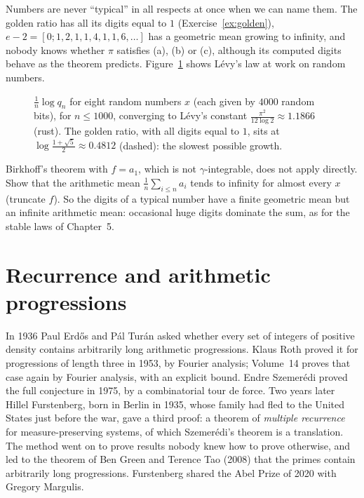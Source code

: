 Numbers are never ``typical'' in all respects at once when we can name them. The golden ratio has all its digits equal to $1$ (Exercise~\ref{ex:golden}), $e-2=[0;1,2,1,1,4,1,1,6,\dots]$ has a geometric mean growing to infinity, and
nobody knows whether $\pi$ satisfies (a), (b) or (c), although its computed digits behave as the theorem predicts. Figure~\ref{fig:levy} shows L\'evy's law at work on random numbers.

\begin{figure}[ht]
\centering{}
\caption{$\frac1n\log q_n$ for eight random numbers $x$ (each given by $4000$ random bits), for $n\le1000$, converging to L\'evy's constant $\frac{\pi^2}{12\log2}\approx1.1866$ (rust). The golden ratio, with all digits equal to $1$, sits at $\log\frac{1+\sqrt5}2\approx0.4812$
(dashed): the slowest possible growth.}
\label{fig:levy}
\end{figure}

\begin{think}
Birkhoff's theorem with $f=a_1$, which is not $\gamma$-integrable, does not apply directly. Show that the arithmetic mean $\frac1n\sum_{i\le n}a_i$ tends to infinity for almost every $x$ (truncate $f$). So the
digits of a typical number have a finite geometric mean but an infinite arithmetic mean: occasional huge digits dominate the sum, as for the stable laws of Chapter~5.
\end{think}

\section{Recurrence and arithmetic progressions}

In 1936 Paul Erd\H{o}s and P\'al Tur\'an asked whether every set of integers of positive density contains arbitrarily long arithmetic progressions. Klaus Roth proved it for progressions of length three in 1953,
by Fourier analysis; Volume~14 proves that case again by Fourier analysis, with an explicit bound. Endre Szemer\'edi proved the full conjecture in 1975, by a combinatorial tour de force. Two years later Hillel Furstenberg, born in Berlin in 1935, whose family had fled to the United
States just before the war, gave a third proof: a theorem of \emph{multiple recurrence} for measure-preserving systems, of which Szemer\'edi's theorem is a translation. The method went on to prove results nobody
knew how to prove otherwise, and led to the theorem of Ben Green and Terence Tao (2008) that the primes contain arbitrarily long progressions. Furstenberg shared the Abel Prize of 2020 with Gregory Margulis.

